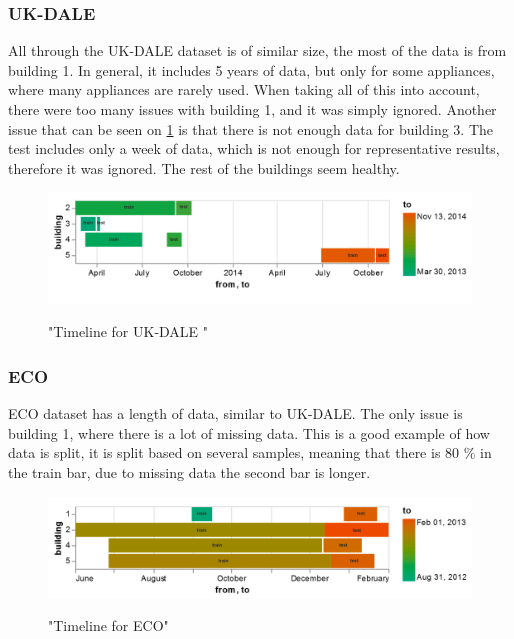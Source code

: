 \subsubsection{UK-DALE} 

All through the UK-DALE \cite{UKDALE} dataset is of similar size, the most of the data is from building 1.
In general, it includes 5 years of data, but only for some appliances, where many appliances are rarely used.
When taking all of this into account, there were too many issues with building 1, and it was simply ignored.
Another issue that can be seen on \ref{fig:ukdale_timeline} is that there is not enough data for 
building 3. The test includes only a week of data, which is not enough for representative results, therefore it was ignored.
The rest of the buildings seem healthy.

\begin{figure}[H]
	\centering
	\caption{"Timeline for UK-DALE "}
	\includegraphics[width=1\textwidth]{Figures/EC/ukdale_timeline.png}
	\label{fig:ukdale_timeline}
\end{figure}

\subsubsection{ECO}
ECO \cite{ECO} dataset has a length of data, similar to UK-DALE. 
The only issue is building 1, where there is a lot of missing data.
This is a good example of how data is split, it is split based on several samples,
meaning that there is 80 \% in the train bar, due to missing data the second bar is longer. 

\begin{figure}[H]
	\centering
	\caption{"Timeline for ECO"}
	\includegraphics[width=1\textwidth]{Figures/EC/eco_timeline.png}
	\label{fig:eco_timeline}
\end{figure}


